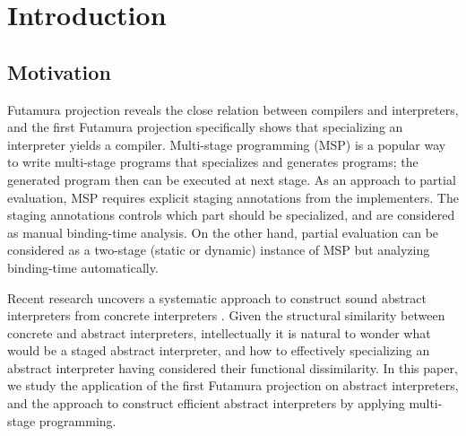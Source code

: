 \section{Introduction}

\subsection{Motivation}

Futamura projection \cite{Futamura1999, futamura1971partial} reveals the close relation between 
compilers and interpreters, 
and the first Futamura projection specifically shows that specializing an interpreter yields a compiler. 
Multi-stage programming (MSP) \cite{taha1999multi, DBLP:conf/pepm/TahaS97} is a popular way to write 
multi-stage programs that specializes and generates programs; the generated program then can be executed 
at next stage. 
As an approach to partial evaluation, MSP requires explicit staging annotations from the implementers.
The staging annotations controls which part should be specialized, and are considered as manual 
binding-time analysis. On the other hand, partial evaluation \cite{DBLP:books/daglib/0072559} can be 
considered as a two-stage (static or dynamic) instance of MSP but analyzing binding-time automatically.

Recent research uncovers a systematic approach to construct sound abstract interpreters 
from concrete interpreters \cite{DBLP:journals/jfp/HornM12, DBLP:conf/icfp/HornM10, DBLP:journals/pacmpl/DaraisLNH17}.
Given the structural similarity between concrete and abstract interpreters, intellectually 
it is natural to wonder what would be a staged abstract interpreter, and how to effectively 
specializing an abstract interpreter having considered their functional dissimilarity. 
In this paper, we study the application of the first Futamura projection on abstract interpreters, 
and the approach to construct efficient abstract interpreters by applying multi-stage programming.

